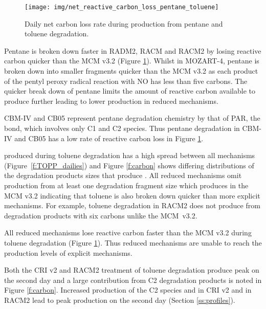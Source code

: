 \begin{figure}
    \centering
    \texttt{[image: img/net\_reactive\_carbon\_loss\_pentane\_toluene]}
    \vspace{0mm}
    \caption{Daily net carbon loss rate during  production from pentane and toluene degradation.}
    \vspace{-4mm}
    \label{f:net_carbon_loss}
\end{figure}

Pentane is broken down faster in RADM2, RACM and RACM2 by losing reactive carbon quicker than the MCM v3.2 (Figure \ref{f:net_carbon_loss}).
Whilst in MOZART-4, pentane is broken down into smaller fragments quicker than the MCM v3.2 as each product of the pentyl peroxy radical reaction with NO has less than five carbons.
The quicker break down of pentane limits the amount of reactive carbon available to produce further  leading to lower  production in reduced mechanisms.

CBM-IV and CB05 represent pentane degradation chemistry by that of PAR, the  bond, which involves only C1 and C2 species.
Thus pentane degradation in CBM-IV and CB05 has a low rate of reactive carbon loss in Figure \ref{f:net_carbon_loss}.

 produced during toluene degradation has a high spread between all mechanisms \mbox{(Figure \ref{f:TOPP_dailies})} and Figure \ref{f:carbon} shows differing distributions of the degradation products sizes that produce .
All reduced mechanisms omit  production from at least one degradation fragment size which produces  in the MCM v3.2 indicating that toluene is also broken down quicker than more explicit mechanisms.
For example, toluene degradation in RACM2 does not produce  from degradation products with six carbons unlike the \mbox{MCM v3.2}.

All reduced mechanisms lose reactive carbon faster than the MCM v3.2 during toluene degradation (Figure \ref{f:net_carbon_loss}).
Thus reduced mechanisms are unable to reach the  production levels of explicit mechanisms.

Both the CRI v2 and RACM2 treatment of toluene degradation produce peak  on the second day and a large contribution from C2 degradation products is noted in Figure \ref{f:carbon}.
Increased  production of the C2 species  and  in CRI v2 and  in RACM2 lead to peak  production on the second day (Section \ref{ss:profiles}).

